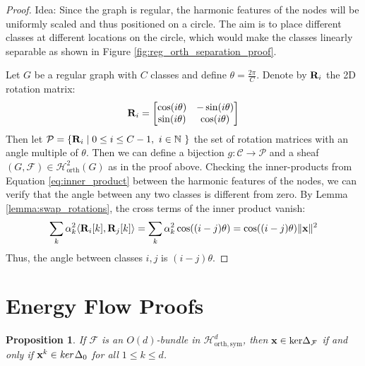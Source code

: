 \documentclass{article}
\newtheorem{proposition}[theorem]{Proposition}
\def\vx{{\bf{x}}}
\def\mR{{\bf{R}}}
\def\gC{{\mathcal{C}}}
\def\gF{{\mathcal{F}}}
\def\gH{{\mathcal{H}}}
\def\gP{{\mathcal{P}}}
\def\sN{{\mathbb{N}}}
\DeclarePairedDelimiter{\norm}{\lVert}{\rVert}
\begin{document}
\begin{proof}
Idea: Since the graph is regular, the harmonic features of the nodes will be uniformly scaled and thus positioned on a circle. The aim is to place different classes at different locations on the circle, which would make the classes linearly separable as shown in Figure \ref{fig:reg_orth_separation_proof}. 

Let $G$ be a regular graph with $C$ classes and define $\theta = \frac{2\pi}{C}$. Denote by $\mR_i$ the 2D rotation matrix:
\begin{equation}
    \mR_i = \begin{bmatrix}
    \cos(i \theta) & - \sin(i \theta) \\
    \sin(i \theta) & \cos(i \theta) \\ 
    \end{bmatrix}
\end{equation}
Then let $\gP = \{\mR_i \mid 0 \leq i \leq C-1,\ i \in \sN\ \}$ the set of rotation matrices with an angle multiple of $\theta$. Then we can define a bijection $g: \gC \to \gP$ and a sheaf $(G, \gF) \in \gH^2_{\mathrm{orth}}(G)$ as in the proof above. Checking the inner-products from Equation \ref{eq:inner_product} between the harmonic features of the nodes, we can verify that the angle between any two classes is different from zero. By Lemma \ref{lemma:swap_rotations}, the cross terms of the inner product vanish:
\begin{align}
    \sum_{k} \alpha_k^2 \langle \mR_i [k],  \mR_j[k] \rangle = \sum_{k} \alpha_k^2 \cos((i - j) \theta) = \cos((i - j) \theta) \norm{\vx}^2
\end{align}
Thus, the angle between classes $i, j$ is $(i - j) \theta$. 
\end{proof}



\section{Energy Flow Proofs}\label{app:energy_flow}

\begin{proposition}\label{prop:harmonicbundle}
If $\mathcal{F}$ is an $O(d)$-bundle in $\gH^d_\mathrm{orth, sym}$, then $\vx \in \mathrm{ker} \Delta_\gF$ if and only if $\vx^{k}\in \emph{ker}\,\Delta_{0}$ for all $1 \leq k \leq d$.
\end{proposition}
\end{document}
